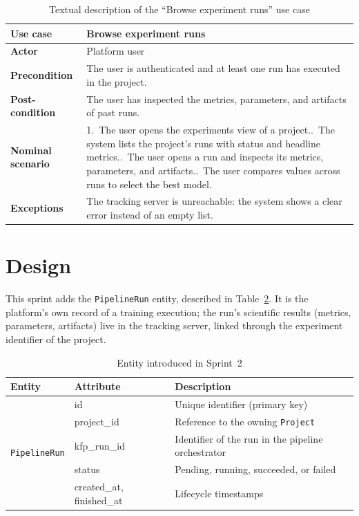\begin{table}[H]\centering
\renewcommand{\arraystretch}{1.3}
\caption{Textual description of the ``Browse experiment runs'' use case}\label{tab:uc-browse}
\begin{tabularx}{\textwidth}{|>{\bfseries}p{3.2cm}|X|}
\hline
Use case & Browse experiment runs\\ \hline
Actor & Platform user\\ \hline
Precondition & The user is authenticated and at least one run has executed in the project.\\ \hline
Post-condition & The user has inspected the metrics, parameters, and artifacts of past runs.\\ \hline
Nominal scenario & 1.~The user opens the experiments view of a project.\newline 2.~The system lists the project's runs with status and headline metrics.\newline 3.~The user opens a run and inspects its metrics, parameters, and artifacts.\newline 4.~The user compares values across runs to select the best model.\\ \hline
Exceptions & The tracking server is unreachable: the system shows a clear error instead of an empty list.\\ \hline
\end{tabularx}
\end{table}

\section{Design}
This sprint adds the \texttt{PipelineRun} entity, described in
Table~\ref{tab:entities-s2}. It is the platform's own record of a training
execution; the run's scientific results (metrics, parameters, artifacts) live in
the tracking server, linked through the experiment identifier of the project.

\begin{table}[H]\centering
\renewcommand{\arraystretch}{1.25}
\caption{Entity introduced in Sprint~2}\label{tab:entities-s2}
\begin{tabularx}{\textwidth}{|l|l|X|}
\hline
\textbf{Entity} & \textbf{Attribute} & \textbf{Description}\\
\hline
\multirow{5}{*}{\texttt{PipelineRun}}
 & id & Unique identifier (primary key)\\ \cline{2-3}
 & project\_id & Reference to the owning \texttt{Project}\\ \cline{2-3}
 & kfp\_run\_id & Identifier of the run in the pipeline orchestrator\\ \cline{2-3}
 & status & Pending, running, succeeded, or failed\\ \cline{2-3}
 & created\_at, finished\_at & Lifecycle timestamps\\
\hline
\end{tabularx}
\end{table}

